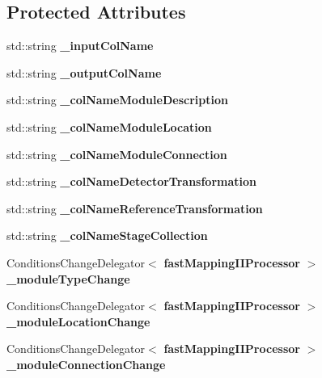 \subsection*{Protected Attributes}
\begin{DoxyCompactItemize}
\item 
std::string {\bfseries \_\-inputColName}\label{classCALICE_1_1fastMappingIIProcessor_a406af5c65eb5b7fae75a9106701a41ce}

\item 
std::string {\bfseries \_\-outputColName}\label{classCALICE_1_1fastMappingIIProcessor_a0ed73861a50691a4514c0444354d1731}

\item 
std::string {\bfseries \_\-colNameModuleDescription}\label{classCALICE_1_1fastMappingIIProcessor_a915ba9b5892f04844a61ccc01614db62}

\item 
std::string {\bfseries \_\-colNameModuleLocation}\label{classCALICE_1_1fastMappingIIProcessor_ac65181dd90dbb0696ab38e0a8ff6c164}

\item 
std::string {\bfseries \_\-colNameModuleConnection}\label{classCALICE_1_1fastMappingIIProcessor_acfa571d0e14c1121db44ebc355a561f1}

\item 
std::string {\bfseries \_\-colNameDetectorTransformation}\label{classCALICE_1_1fastMappingIIProcessor_af7bcda3e2cda9ee7e41dcf780243c1fd}

\item 
std::string {\bfseries \_\-colNameReferenceTransformation}\label{classCALICE_1_1fastMappingIIProcessor_a7d554688321a42669be0482eac40daf3}

\item 
std::string {\bfseries \_\-colNameStageCollection}\label{classCALICE_1_1fastMappingIIProcessor_ac85b4eccc768ff4ca78280aaadab1402}

\item 
ConditionsChangeDelegator$<$ {\bf fastMappingIIProcessor} $>$ {\bfseries \_\-moduleTypeChange}\label{classCALICE_1_1fastMappingIIProcessor_a3bec21933dd1ca7dec20c925ec4a502a}

\item 
ConditionsChangeDelegator$<$ {\bf fastMappingIIProcessor} $>$ {\bfseries \_\-moduleLocationChange}\label{classCALICE_1_1fastMappingIIProcessor_ac210ebf21a676091fbc1c481c90705b0}

\item 
ConditionsChangeDelegator$<$ {\bf fastMappingIIProcessor} $>$ {\bfseries \_\-moduleConnectionChange}\label{classCALICE_1_1fastMappingIIProcessor_a1313dddb8ca17fb34b960428e1458635}


\end{DoxyCompactItemize}

